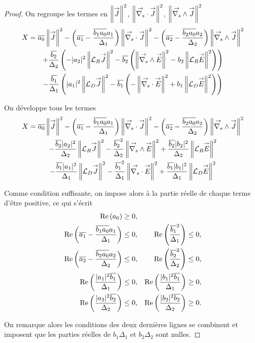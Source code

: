 \begin{proof}
    On regroupe les termes en \(\norm{\vJ}^2\), \(\norm{\vdivs\vJ}^2\),  \(\norm{\vrots\vJ}^2\)
    \begin{multline*}
      X = \conj{a_0} \norm{\vJ }^2 - \left(\conj{a_1} - \frac{\conj{b_1a_0}a_1}{\Delta_1}\right) \norm{\vdivs \vJ}^2 - \left(\conj{a_2} - \frac{\conj{b_2a_0}a_2}{\Delta_2}\right) \norm{\vrots \vJ }^2
      \\
      + \frac{\conj{b_2}}{\Delta_2}\left( - |a_2|^2\norm{\LR \vJ}^2  - \conj{b_2}\left(\norm{\vrots\vE}^2 - b_2 \norm{\LR \vE }^2\right)\right) 
      \\
      - \frac{\conj{b_1}}{\Delta_1}\left( |a_1|^2\norm{\LD \vJ}^2  - \conj{b_1}\left(-\norm{\vdivs\vE}^2 + b_1 \norm{\LD \vE }^2\right)\right)
    \end{multline*}

    On développe tous les termes
    \begin{multline*}
      X = \conj{a_0} \norm{\vJ }^2 - \left(\conj{a_1} - \frac{\conj{b_1a_0}a_1}{\Delta_1}\right) \norm{\vdivs \vJ }^2 - \left(\conj{a_2} - \frac{\conj{b_2a_0}a_2}{\Delta_2}\right) \norm{\vrots \vJ }^2
      \\
      - \frac{\conj{b_2}|a_2|^2}{\Delta_2}\norm{\LR \vJ}^2  -  \frac{\conj{b_2}^2}{\Delta_2}\norm{\vrots\vE}^2 +  \frac{\conj{b_2}|b_2|^2}{\Delta_2} \norm{\LR \vE }^2
      \\
      - \frac{\conj{b_1}|a_1|^2}{\Delta_1}\norm{\LD \vJ}^2  - \frac{\conj{b_1}^2}{\Delta_1}\norm{\vdivs\vE}^2 + \frac{\conj{b_1}|b_1|^2}{\Delta_1} \norm{\LD \vE }^2
    \end{multline*}

    Comme condition suffisante, on impose alors à la partie réelle de chaque terme d'être positive, ce qui s'écrit
    \begin{align*}
      \Re\left(a_0\right)\ge 0, && 
      \\
      \Re\left(\conj{a_1} - \frac{\conj{b_1a_0}a_1}{\Delta_1}\right) \le 0, && \Re\left(\frac{\conj{b_1}^2}{\Delta_1}\right) \le 0,
      \\
      \Re\left(\conj{a_2} - \frac{\conj{b_2a_0}a_2}{\Delta_2}\right) \le 0, && \Re\left(\frac{\conj{b_2}^2}{\Delta_2}\right) \le 0,
      \\
      \Re\left(\frac{|a_1|^2\conj{b_1}}{\Delta_1}\right) \le 0, && \Re\left(\frac{|b_1|^2\conj{b_1}}{\Delta_1}\right) \ge 0,
      \\
      \Re\left(\frac{|a_2|^2\conj{b_2}}{\Delta_2}\right) \le 0, && \Re\left(\frac{|b_2|^2\conj{b_2}}{\Delta_2}\right) \ge 0.
    \end{align*}


    On remarque alors les conditions des deux dernières lignes se combinent et imposent que les parties réelles de \(b_1\Delta_1\) et \(b_2\Delta_2\) sont nulles.
  \end{proof}


